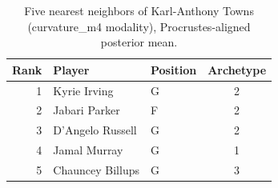 \begin{table}[htbp]
  \centering\small
  \begin{tabular}{rllc}
    \toprule
    Rank & Player & Position & Archetype \\
    \midrule
    1 & Kyrie Irving & G & 2 \\
    2 & Jabari Parker & F & 2 \\
    3 & D'Angelo Russell & G & 2 \\
    4 & Jamal Murray & G & 1 \\
    5 & Chauncey Billups & G & 3 \\
    \bottomrule
  \end{tabular}
  \caption{Five nearest neighbors of Karl-Anthony Towns (curvature_m4 modality), Procrustes-aligned posterior mean.}
  \label{tab:Karl_Anthony_Towns_neighbors_curvature_m4}
\end{table}

